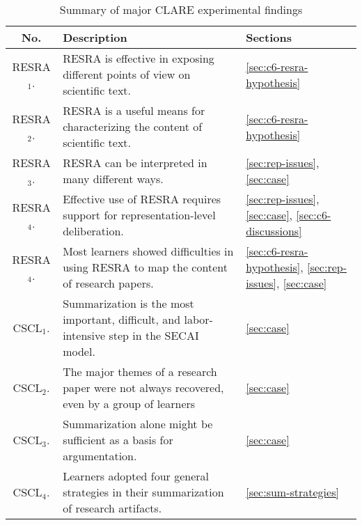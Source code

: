 \small
\begin{table}[hbtp]
  \caption{Summary of major CLARE experimental findings}
  \begin{center}
    \begin{tabular} {||c|p{4.0in}|p{0.5in}||} \hline   
    {\bf No.} &   {\bf Description}  & {\bf Sections} \\ \hline \hline

    {\sf RESRA\(_1\).} & RESRA is effective in exposing different points of
    view on scientific text. & \ref{sec:c6-resra-hypothesis} \\ \hline  
    
    {\sf RESRA\(_2\).} & RESRA is a useful means for characterizing the
    content of scientific text. & \ref{sec:c6-resra-hypothesis} \\ \hline
 
    {\sf RESRA\(_3\).} & RESRA can be interpreted in many different
    ways.  & \ref{sec:rep-issues}, \ref{sec:case} \\ \hline
    
    {\sf RESRA\(_4\).} & Effective use of RESRA requires support for
    representation-level deliberation. & \ref{sec:rep-issues},
    \ref{sec:case}, \ref{sec:c6-discussions} \\ \hline
    
    {\sf RESRA\(_4\).} & Most learners showed difficulties in using
    RESRA to map the content of research papers. &
    \ref{sec:c6-resra-hypothesis}, \ref{sec:rep-issues},
    \ref{sec:case} \\ \hline \hline
    
    {\sf CSCL\(_1\).} & Summarization is the most important, difficult,
    and labor-intensive step in the SECAI model. &
    \ref{sec:case} \\ \hline
     
    {\sf CSCL\(_2\).} & The major themes of a research paper were
    not always recovered, even by a group of learners & \ref{sec:case} \\ \hline
    
    {\sf CSCL\(_3\).} & Summarization alone might be sufficient as a
    basis for argumentation. & \ref{sec:case}  \\ \hline
   
   {\sf CSCL\(_4\).} & Learners adopted four general strategies in their
   summarization of research artifacts. & 
   \ref{sec:sum-strategies}  \\ \hline
   

\end{tabular}
\end{center}
\end{table}
